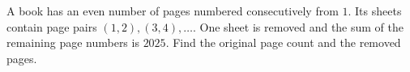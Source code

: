 A book has an even number of pages numbered consecutively from $1$. Its sheets contain page pairs $(1,2),(3,4),\ldots$. One sheet is removed and the sum of the remaining page numbers is $2025$. Find the original page count and the removed pages.
